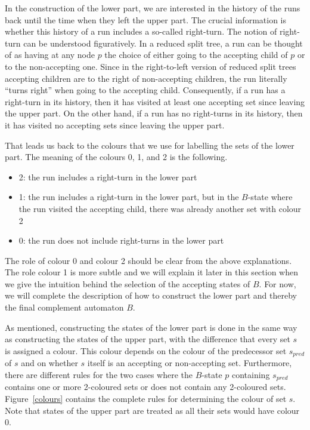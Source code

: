 In the construction of the lower part, we are interested in the history of the runs back until the time when they left the upper part. The crucial information is whether this history of a run includes a so-called right-turn. The notion of right-turn can be understood figuratively. In a reduced split tree, a run can be thought of as having at any node $p$ the choice of either going to the accepting child of $p$ or to the non-accepting one. Since in the right-to-left version of reduced split trees accepting children are to the right of non-accepting children, the run literally ``turns right'' when going to the accepting child. Consequently, if a run has a right-turn in its history, then it has visited at least one accepting set since leaving the upper part. On the other hand, if a run has no right-turns in its history, then it has visited no accepting sets since leaving the upper part.

That leads us back to the colours that we use for labelling the sets of the lower part. The meaning of the colours 0, 1, and 2 is the following.
\begin{itemize}
\item 2: the run includes a right-turn in the lower part
\item 1: the run includes a right-turn in the lower part, but in the $B$-state where the run visited the accepting child, there was already another set with colour 2
\item 0: the run does not include right-turns in the lower part
\end{itemize}

The role of colour 0 and colour 2 should be clear from the above explanations. The role colour 1 is more subtle and we will explain it later in this section when we give the intuition behind the selection of the accepting states of $B$. For now, we will complete the description of how to construct the lower part and thereby the final complement automaton $B$.

As mentioned, constructing the states of the lower part is done in the same way as constructing the states of the upper part, with the difference that every set $s$ is assigned a colour. This colour depends on the colour of the predecessor set $s_{pred}$ of $s$ and on whether $s$ itself is an accepting or non-accepting set. Furthermore, there are different rules for the two cases where the $B$-state $p$ containing $s_{pred}$ contains one or more 2-coloured sets or does not contain any 2-coloured sets. Figure~\ref{colours} contains the complete rules for determining the colour of set $s$. Note that states of the upper part are treated as all their sets would have colour 0.

